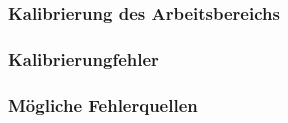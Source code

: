 \subsubsection{Kalibrierung des Arbeitsbereichs}\label{sec:planeCalib}
\subsubsection{Kalibrierungfehler} \label{sec:calibError}
\subsubsection{Mögliche Fehlerquellen} \label{sec:calibErrorSources}


